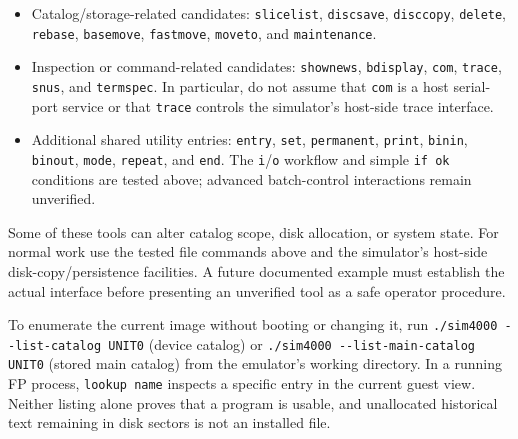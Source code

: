 \begin{itemize}
\tightlist
\item
  Catalog/storage-related candidates: \passthrough{\lstinline!slicelist!}, \passthrough{\lstinline!discsave!}, \passthrough{\lstinline!disccopy!}, \passthrough{\lstinline!delete!}, \passthrough{\lstinline!rebase!}, \passthrough{\lstinline!basemove!}, \passthrough{\lstinline!fastmove!}, \passthrough{\lstinline!moveto!}, and \passthrough{\lstinline!maintenance!}.
\item
  Inspection or command-related candidates: \passthrough{\lstinline!shownews!}, \passthrough{\lstinline!bdisplay!}, \passthrough{\lstinline!com!}, \passthrough{\lstinline!trace!}, \passthrough{\lstinline!snus!}, and \passthrough{\lstinline!termspec!}. In particular, do not assume that \passthrough{\lstinline!com!} is a host serial-port service or that \passthrough{\lstinline!trace!} controls the simulator's host-side trace interface.
\item
  Additional shared utility entries: \passthrough{\lstinline!entry!}, \passthrough{\lstinline!set!}, \passthrough{\lstinline!permanent!}, \passthrough{\lstinline!print!}, \passthrough{\lstinline!binin!}, \passthrough{\lstinline!binout!}, \passthrough{\lstinline!mode!}, \passthrough{\lstinline!repeat!}, and \passthrough{\lstinline!end!}. The \passthrough{\lstinline!i!}/\passthrough{\lstinline!o!} workflow and simple \passthrough{\lstinline!if ok!} conditions are tested above; advanced batch-control interactions remain unverified.
\end{itemize}

Some of these tools can alter catalog scope, disk allocation, or system state. For normal work use the tested file commands above and the simulator's host-side disk-copy/persistence facilities. A future documented example must establish the actual interface before presenting an unverified tool as a safe operator procedure.

To enumerate the current image without booting or changing it, run \passthrough{\lstinline!./sim4000 --list-catalog UNIT0!} (device catalog) or \passthrough{\lstinline!./sim4000 --list-main-catalog UNIT0!} (stored main catalog) from the emulator's working directory. In a running FP process, \passthrough{\lstinline!lookup name!} inspects a specific entry in the current guest view. Neither listing alone proves that a program is usable, and unallocated historical text remaining in disk sectors is not an installed file.
